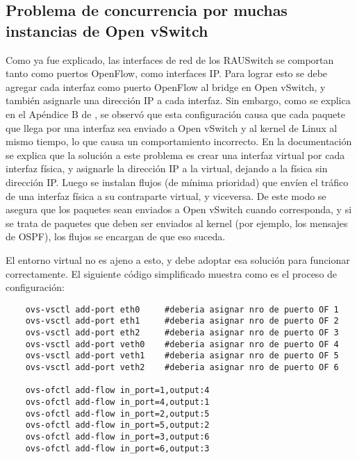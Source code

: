 \subsection{Problema de concurrencia por muchas instancias de Open vSwitch}
Como ya fue explicado, las interfaces de red de los RAUSwitch se comportan tanto como puertos OpenFlow, como interfaces IP. Para lograr esto se debe agregar cada interfaz como puerto OpenFlow al bridge en Open vSwitch, y también asignarle una dirección IP a cada interfaz. Sin embargo, como se explica en el Apéndice B de \cite{proyecto-rrap}, se observó que esta configuración causa que cada paquete que llega por una interfaz sea enviado a Open vSwitch y al kernel de Linux al mismo tiempo, lo que causa un comportamiento incorrecto. En la documentación se explica que la solución a este problema es crear una interfaz virtual por cada interfaz física, y asignarle la dirección IP a la virtual, dejando a la física sin dirección IP. Luego se instalan flujos (de mínima prioridad) que envíen el tráfico de una interfaz física a su contraparte virtual, y viceversa. De este modo se asegura que los paquetes sean enviados a Open vSwitch cuando corresponda, y si se trata de paquetes que deben ser enviados al kernel (por ejemplo, los mensajes de OSPF), los flujos se encargan de que eso suceda.

El entorno virtual no es ajeno a esto, y debe adoptar esa solución para funcionar correctamente. El siguiente código simplificado muestra como es el proceso de configuración:
\begin{lstlisting}
	ovs-vsctl add-port eth0		#deberia asignar nro de puerto OF 1
	ovs-vsctl add-port eth1		#deberia asignar nro de puerto OF 2
	ovs-vsctl add-port eth2		#deberia asignar nro de puerto OF 3
	ovs-vsctl add-port veth0	#deberia asignar nro de puerto OF 4
	ovs-vsctl add-port veth1	#deberia asignar nro de puerto OF 5
	ovs-vsctl add-port veth2	#deberia asignar nro de puerto OF 6
	
	ovs-ofctl add-flow in_port=1,output:4
	ovs-ofctl add-flow in_port=4,output:1
	ovs-ofctl add-flow in_port=2,output:5
	ovs-ofctl add-flow in_port=5,output:2
	ovs-ofctl add-flow in_port=3,output:6
	ovs-ofctl add-flow in_port=6,output:3
\end{lstlisting}

